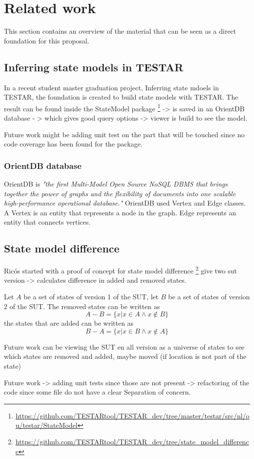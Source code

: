 \section{Related work} \label{releatedWork}

This section contains an overview of the material that can be seen as a direct foundation for this proposal.

\subsection{Inferring state models in TESTAR}

In a recent student master graduation project, Inferring state mdoels in TESTAR, \cite{thesisMulders}  the foundation is created to build state models with TESTAR. The result can be found inside the StateModel package \footnote{\url{https://github.com/TESTARtool/TESTAR_dev/tree/master/testar/src/nl/ou/testar/StateModel}}
-> is saved in an OrientDB database - > which gives good query options -> viewer is build to see the model. 

Future work might be adding unit test on the part that will be touched since no code coverage has been found for the package.

\subsubsection{OrientDB database}

OrientDB is \textit{"the first Multi-Model Open Source NoSQL DBMS that brings together the power of graphs and the flexibility of documents into one scalable high-performance operational database."} \cite{orientdb1} 
OrientDB used Vertex and Edge classes. A Vertex is an entity that represents a node in the graph. Edge represents an entity that connects vertices. 


\subsection{State model difference}
Ricós started with a proof of concept for state model difference \footnote{\url{https://github.com/TESTARtool/TESTAR\_dev/tree/state_model_difference}}
give two sut version -> calculates difference in added and removed states.

Let $A$ be a set of states of version 1 of the SUT, let $B$ be a set of states of version 2 of the SUT. The removed states can be written as
\[A-B = \lbrace x | x \in A \wedge x \notin B \rbrace\]
the states that are added can be written as
\[B-A = \lbrace x | x \in B \wedge x \notin A \rbrace\]

Future work can be viewing the SUT en all version as a universe of states to see which states are removed and added, maybe moved (if location is not part of the state)

Future work -> adding unit tests since those are not present -> refactoring of the code since some file do not have a clear Separation of concern.